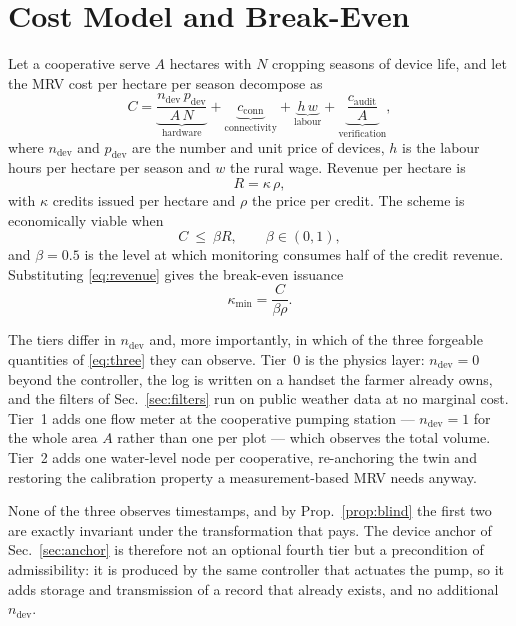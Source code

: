 \documentclass[journal]{IEEEtran}
\begin{document}
\section{Cost Model and Break-Even}
\label{sec:cost}

Let a cooperative serve $A$ hectares with $N$ cropping seasons of device life,
and let the MRV cost per hectare per season decompose as
\begin{equation}
C=\underbrace{\frac{n_{\mathrm{dev}}\,p_{\mathrm{dev}}}{A\,N}}_{\text{hardware}}
+\underbrace{c_{\mathrm{conn}}}_{\text{connectivity}}
+\underbrace{h\,w}_{\text{labour}}
+\underbrace{\frac{c_{\mathrm{audit}}}{A}}_{\text{verification}},
\label{eq:cost}
\end{equation}
where $n_{\mathrm{dev}}$ and $p_{\mathrm{dev}}$ are the number and unit price of
devices, $h$ is the labour hours per hectare per season and $w$ the rural wage.
Revenue per hectare is
\begin{equation}
R=\kappa\,\rho ,
\label{eq:revenue}
\end{equation}
with $\kappa$ credits issued per hectare and $\rho$ the price per credit. The
scheme is economically viable when
\begin{equation}
C\ \le\ \beta R ,\qquad \beta\in(0,1),
\label{eq:breakeven}
\end{equation}
and $\beta=0.5$ is the level at which monitoring consumes half of the credit
revenue. Substituting \eqref{eq:revenue} gives the break-even issuance
\begin{equation}
\kappa_{\min}=\frac{C}{\beta\rho}.
\label{eq:kappamin}
\end{equation}

The tiers differ in $n_{\mathrm{dev}}$ and, more importantly, in which of the
three forgeable quantities of \eqref{eq:three} they can observe. Tier~0 is the
physics layer: $n_{\mathrm{dev}}=0$ beyond the controller, the log is written on
a handset the farmer already owns, and the filters of Sec.~\ref{sec:filters} run
on public weather data at no marginal cost. Tier~1 adds one flow meter at the
cooperative pumping station --- $n_{\mathrm{dev}}=1$ for the whole area $A$
rather than one per plot --- which observes the total volume. Tier~2 adds one
water-level node per cooperative, re-anchoring the twin and restoring the
calibration property a measurement-based MRV needs anyway.

None of the three observes timestamps, and by Prop.~\ref{prop:blind} the first
two are exactly invariant under the transformation that pays. The device anchor
of Sec.~\ref{sec:anchor} is therefore not an optional fourth tier but a
precondition of admissibility: it is produced by the same controller that
actuates the pump, so it adds storage and transmission of a record that already
exists, and no additional $n_{\mathrm{dev}}$.
\end{document}
